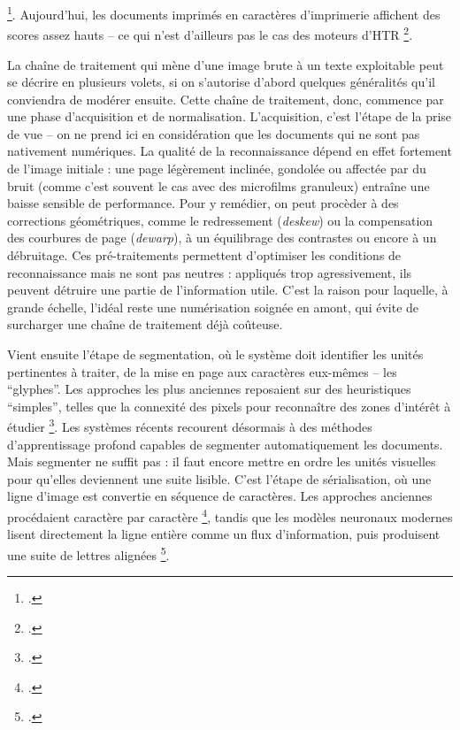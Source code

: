\footcite[][]{bermesbook}. Aujourd'hui, les documents imprimés en caractères d'imprimerie affichent des scores assez hauts -- ce qui n'est d'ailleurs pas le cas des moteurs d'HTR \footcite[][]{chiron}.

La chaîne de traitement qui mène d’une image brute à un texte exploitable peut se décrire en plusieurs volets, si on s'autorise d'abord quelques généralités qu'il conviendra de modérer ensuite. Cette chaîne de traitement, donc, commence par une phase d’acquisition et de normalisation. L'acquisition, c'est l'étape de la prise de vue  -- on ne prend ici en considération que les documents qui ne sont pas nativement numériques. La qualité de la reconnaissance dépend en effet fortement de l’image initiale : une page légèrement inclinée, gondolée ou affectée par du bruit (comme c’est souvent le cas avec des microfilms granuleux) entraîne une baisse sensible de performance. Pour y remédier, on peut procèder à des corrections géométriques, comme le redressement (\emph{deskew}) ou la compensation des courbures de page (\emph{dewarp}), à un équilibrage des contrastes ou encore à un débruitage. Ces pré-traitements permettent d’optimiser les conditions de reconnaissance mais ne sont pas neutres : appliqués trop agressivement, ils peuvent détruire une partie de l’information utile. C’est la raison pour laquelle, à grande échelle, l’idéal reste une numérisation soignée en amont, qui évite de surcharger une chaîne de traitement déjà coûteuse.

Vient ensuite l’étape de segmentation, où le système doit identifier les unités pertinentes à traiter, de la mise en page aux caractères eux-mêmes -- les \enquote{glyphes}.  Les approches les plus anciennes reposaient sur des heuristiques \enquote{simples}, telles que  la connexité des pixels pour reconnaître des zones d'intérêt à étudier \footcite[][]{lecolinet}. Les systèmes récents recourent désormais à des méthodes d’apprentissage profond capables de segmenter automatiquement les documents. Mais segmenter ne suffit pas : il faut encore mettre en ordre les unités visuelles pour qu’elles deviennent une suite lisible. C’est l’étape de sérialisation, où une ligne d’image est convertie en séquence de caractères. Les approches anciennes procédaient caractère par caractère \footcite[][]{lecolinet}, tandis que les modèles neuronaux modernes lisent directement la ligne entière comme un flux d’information, puis produisent une suite de lettres alignées \footcite[][]{graves}.


